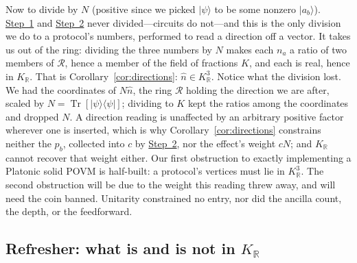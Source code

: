 \documentclass[11pt,a4paper]{article}
\DeclareMathOperator{\Tr}{Tr}
\newcommand{\R}{\mathbb{R}}
\newcommand{\ket}[1]{|#1\rangle}
\newcommand{\ketbra}[2]{|#1\rangle\langle#2|}
\begin{document}
Now to divide by $N$ (positive since we picked $\ket{\psi}$ to be some nonzero $\ket{a_b}$). \hyperref[sec:decker:step1]{Step~1} and \hyperref[sec:decker:step2]{Step~2} never divided---circuits do not---and this is the only division we do to a protocol's numbers, performed to read a direction off a vector. It takes us out of the ring: dividing the three numbers by $N$ makes each $n_a$ a ratio of two members of $\mathcal{R}$, hence a member of the field of fractions $K$, and each is real, hence in $K_\R$. That is Corollary~\ref{cor:directions}: $\hat n \in K_\R^3$. Notice what the division lost. We had the coordinates of $N\hat n$, the ring $\mathcal{R}$ holding the direction we are after, scaled by $N = \Tr[\ketbra{\psi}{\psi}]$; dividing to $K$ kept the ratios among the coordinates and dropped $N$. A direction reading is unaffected by an arbitrary positive factor wherever one is inserted, which is why Corollary~\ref{cor:directions} constrains neither the $p_b$, collected into $c$ by \hyperref[sec:decker:step2]{Step~2}, nor the effect's weight $cN$; and $K_\R$ cannot recover that weight either. Our first obstruction to exactly implementing a Platonic solid POVM is half-built: a protocol's vertices must lie in $K_\R^3$. The second obstruction will be due to the weight this reading threw away, and will need the coin banned. Unitarity constrained no entry, nor did the ancilla count, the depth, or the feedforward.

\subsection{Refresher: what is and is not in \texorpdfstring{$K_\R$}{KR}}
\end{document}
